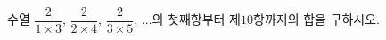 수열 $\dfrac{2}{1\times 3}$, $\dfrac{2}{2\times 4}$, $\dfrac{2}{3\times 5}$, $\ldots$의 첫째항부터 제$10$항까지의 합을 구하시오.
